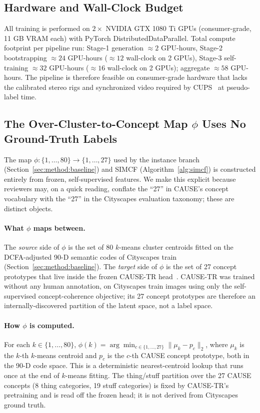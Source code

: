 \documentclass{article}
\begin{document}
\subsection{Hardware and Wall-Clock Budget}
\label{sec:supp:impl:hardware}

All training is performed on $2\times$ NVIDIA GTX 1080 Ti GPUs (consumer-grade, 11 GB VRAM each) with PyTorch DistributedDataParallel. Total compute footprint per pipeline run: Stage-1 generation $\approx 2$ GPU-hours, Stage-2 bootstrapping $\approx 24$ GPU-hours ($\approx 12$ wall-clock on 2 GPUs), Stage-3 self-training $\approx 32$ GPU-hours ($\approx 16$ wall-clock on 2 GPUs); aggregate $\approx 58$ GPU-hours. The pipeline is therefore feasible on consumer-grade hardware that lacks the calibrated stereo rigs and synchronized video required by CUPS~\cite{hahn2025cups} at pseudo-label time.

\subsection{The Over-Cluster-to-Concept Map $\phi$ Uses No Ground-Truth Labels}
\label{sec:supp:impl:phi}

The map $\phi : \{1, \dots, 80\} \to \{1, \dots, 27\}$ used by the instance branch (Section~\ref{sec:method:baseline}) and SIMCF (Algorithm~\ref{alg:simcf}) is constructed entirely from frozen, self-supervised features. We make this explicit because reviewers may, on a quick reading, conflate the ``27'' in CAUSE's concept vocabulary with the ``27'' in the Cityscapes evaluation taxonomy; these are distinct objects.

\paragraph{What $\phi$ maps between.}
The \emph{source} side of $\phi$ is the set of 80 $k$-means cluster centroids fitted on the DCFA-adjusted 90-D semantic codes of Cityscapes train (Section~\ref{sec:method:baseline}). The \emph{target} side of $\phi$ is the set of 27 concept prototypes that live inside the frozen CAUSE-TR head~\cite{kim2024cause}. CAUSE-TR was trained without any human annotation, on Cityscapes train images using only the self-supervised concept-coherence objective; its 27 concept prototypes are therefore an internally-discovered partition of the latent space, not a label space.

\paragraph{How $\phi$ is computed.}
For each $k \in \{1, \dots, 80\}$, $\phi(k) = \arg\min_{c \in \{1, \dots, 27\}} \|\mu_k - p_c\|_2$, where $\mu_k$ is the $k$-th $k$-means centroid and $p_c$ is the $c$-th CAUSE concept prototype, both in the 90-D code space. This is a deterministic nearest-centroid lookup that runs once at the end of $k$-means fitting. The thing/stuff partition over the 27 CAUSE concepts (8 thing categories, 19 stuff categories) is fixed by CAUSE-TR's pretraining and is read off the frozen head; it is not derived from Cityscapes ground truth.
\end{document}

